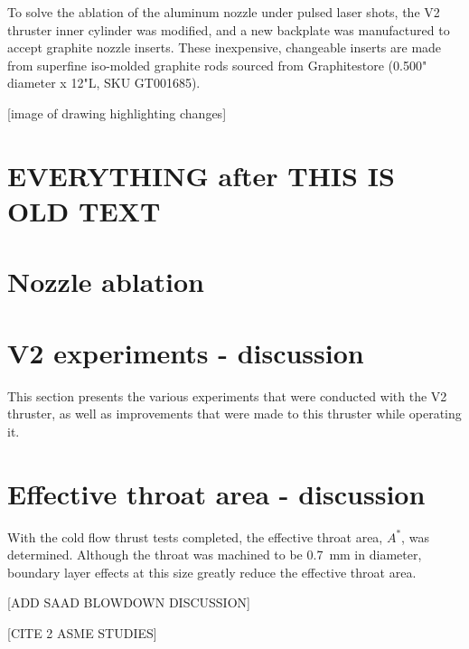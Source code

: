    To solve the ablation of the aluminum nozzle under pulsed laser shots, the V2 thruster inner cylinder was modified, and a new backplate was manufactured to accept graphite nozzle inserts. These inexpensive, changeable inserts are made from superfine iso-molded graphite rods sourced from Graphitestore (0.500" diameter x 12"L, SKU GT001685).

    [image of drawing highlighting changes]

\section*{EVERYTHING after THIS IS OLD TEXT}

    \section{Nozzle ablation}

    \section{V2 experiments - discussion}
        This section presents the various experiments that were conducted with the V2 thruster, as well as improvements that were made to this thruster while operating it.

    \section{Effective throat area - discussion}
            
        With the cold flow thrust tests completed, the effective throat area, $A^*$, was determined. Although the throat was machined to be \qty{0.7}{mm} in diameter, boundary layer effects at this size greatly reduce the effective throat area.

        [ADD SAAD BLOWDOWN DISCUSSION]

        [CITE 2 ASME STUDIES]

    